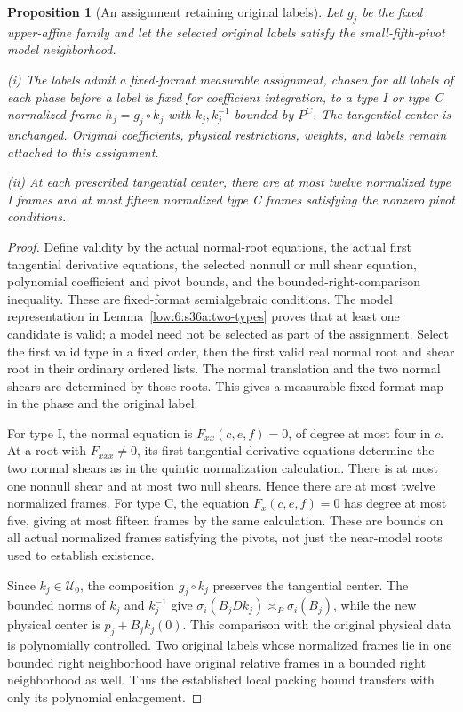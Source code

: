 \documentclass[11pt]{amsart}
\newtheorem{proposition}[theorem]{Proposition}
\theoremstyle{definition}
\theoremstyle{remark}
\numberwithin{equation}{section}
\begin{document}
\begin{proposition}[An assignment retaining original labels]\label{low:6:s36a:assignment}
Let $g_j$ be the fixed upper-affine family and let the selected original labels satisfy the small-fifth-pivot model neighborhood.

\noindent\textup{(i)} The labels admit a fixed-format measurable assignment, chosen for all labels of each phase before a label is fixed for coefficient integration, to a type I or type C normalized frame $h_j=g_j\circ k_j$ with $k_j,k_j^{-1}$ bounded by $P^C$. The tangential center is unchanged. Original coefficients, physical restrictions, weights, and labels remain attached to this assignment.

\noindent\textup{(ii)} At each prescribed tangential center, there are at most twelve normalized type I frames and at most fifteen normalized type C frames satisfying the nonzero pivot conditions.
\end{proposition}
\begin{proof}
Define validity by the actual normal-root equations, the actual first tangential derivative equations, the selected nonnull or null shear equation, polynomial coefficient and pivot bounds, and the bounded-right-comparison inequality. These are fixed-format semialgebraic conditions. The model representation in Lemma~\ref{low:6:s36a:two-types} proves that at least one candidate is valid; a model need not be selected as part of the assignment. Select the first valid type in a fixed order, then the first valid real normal root and shear root in their ordinary ordered lists. The normal translation and the two normal shears are determined by those roots. This gives a measurable fixed-format map in the phase and the original label.

For type I, the normal equation is $F_{xx}(c,e,f)=0$, of degree at most four in $c$. At a root with $F_{xxx}\ne0$, its first tangential derivative equations determine the two normal shears as in the quintic normalization calculation. There is at most one nonnull shear and at most two null shears. Hence there are at most twelve normalized frames. For type C, the equation $F_x(c,e,f)=0$ has degree at most five, giving at most fifteen frames by the same calculation. These are bounds on all actual normalized frames satisfying the pivots, not just the near-model roots used to establish existence.

Since $k_j\in\mathcal U_0$, the composition $g_j\circ k_j$ preserves the tangential center. The bounded norms of $k_j$ and $k_j^{-1}$ give $\sigma_i(B_jDk_j)\asymp_P\sigma_i(B_j)$, while the new physical center is $p_j+B_jk_j(0)$. This comparison with the original physical data is polynomially controlled. Two original labels whose normalized frames lie in one bounded right neighborhood have original relative frames in a bounded right neighborhood as well. Thus the established local packing bound transfers with only its polynomial enlargement.
\end{proof}
\end{document}
